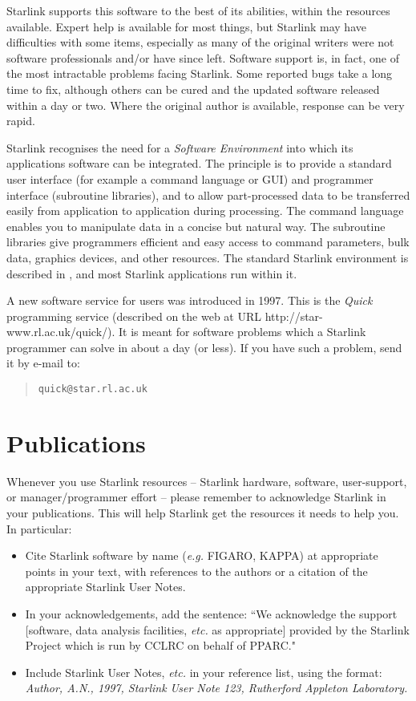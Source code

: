 Starlink supports this software to the best of its abilities, within the
resources available.
Expert help is available for most things, but Starlink may have difficulties
with some items, especially as many of the original writers were not software
professionals and/or have since left.
Software support is, in fact, one of the most intractable problems facing
Starlink.
Some reported bugs take a long time to fix, although others can be cured
and the updated software released within a day or two.
Where the original author is available, response can be very rapid.

Starlink recognises the need for a {\em Software Environment}\/ into which its
applications software can be integrated.
The principle is to provide a standard user interface (for example a command
language or GUI) and programmer interface (subroutine libraries), and to allow
part-processed data to be transferred easily from application to application
during processing.
The command language enables you to manipulate data in a concise but natural
way.
The subroutine libraries give programmers efficient and easy access to
command parameters, bulk data, graphics devices, and other resources.
The standard Starlink environment is described in
,
and most Starlink applications run within it.

A new software service for users was introduced in 1997.
This is the {\em Quick}\/ programming service (described on the web at URL
{http://star-www.rl.ac.uk/quick/}).
It is meant for software problems which a Starlink programmer can solve in
about a day (or less).
If you have such a problem, send it by e-mail to:
\begin{quote}
{\tt quick@star.rl.ac.uk}
\end{quote}

\newpage

\section{Publications}

Whenever you use Starlink resources -- Starlink hardware, software,
user-support, or manager/programmer effort -- please remember to acknowledge
Starlink in your publications.
This will help Starlink get the resources it needs to help you.
In particular:
\begin{itemize}
\item Cite Starlink software by name ({\em e.g.}\/ FIGARO, KAPPA) at
appropriate points in your text, with references to the authors or a citation
of the appropriate Starlink User Notes.
\item In your acknowledgements, add the sentence: ``We acknowledge the support
[software, data analysis facilities, {\em etc.}\/ as appropriate] provided
by the Starlink Project which is run by CCLRC on behalf of PPARC."
\item Include Starlink User Notes, {\em etc.}\/ in your reference list, using
the format:\\
{\em Author, A.N., 1997, Starlink User Note 123, Rutherford Appleton
Laboratory.}
\end{itemize}

